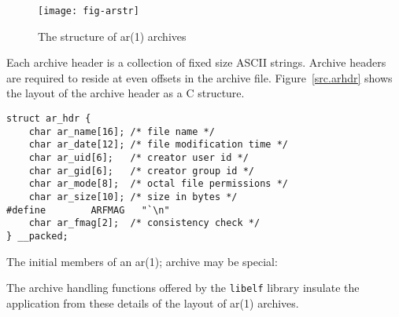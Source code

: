 \documentclass[a4paper,pdftex]{book}
\newcommand{\firstterm}[1]{\textit{#1}}
\newcommand{\library}[1]{\texttt{#1}}
\newcommand{\parameter}[1]{\texttt{#1}}
\newcommand{\tool}[1]{\textbf{#1}}
\begin{document}
\begin{figure}
  \begin{center}
    \texttt{[image: fig-arstr]}
  \end{center}
  \caption{The structure of ar(1) archives}\label{fig.arstr}
\end{figure}

Each archive header is a collection of fixed size ASCII
strings. Archive headers are required
to reside at even offsets in the archive file.
Figure~\vref{src.arhdr} shows the layout of the archive header as a C
structure.

\begin{lstlisting}[caption=Archive Header Layout, label=src.arhdr]
struct ar_hdr {
    char ar_name[16]; /* file name */
    char ar_date[12]; /* file modification time */
    char ar_uid[6];   /* creator user id */
    char ar_gid[6];   /* creator group id */
    char ar_mode[8];  /* octal file permissions */
    char ar_size[10]; /* size in bytes */
#define        ARFMAG   "`\n"
    char ar_fmag[2];  /* consistency check */
} __packed;
\end{lstlisting}

The initial members of an ar(1); archive may be special:


The archive handling functions offered by the \library{libelf} library
insulate the application from these details of the layout of
ar(1) archives.
\end{document}
